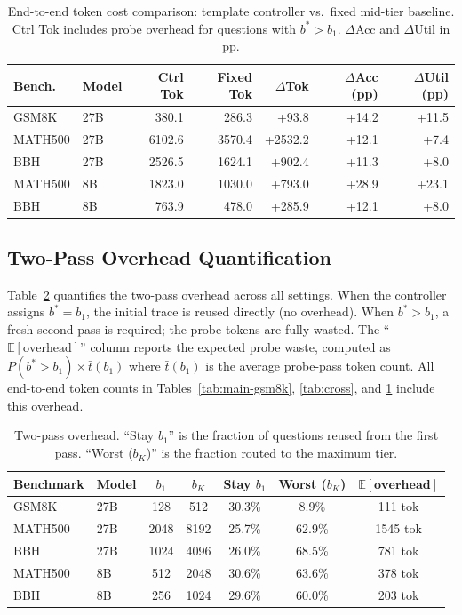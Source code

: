 \begin{table}[ht]
\centering
\caption{End-to-end token cost comparison: template controller vs.\ fixed mid-tier baseline. Ctrl Tok includes probe overhead for questions with $b^* > b_1$. $\Delta$Acc and $\Delta$Util in pp.}
\label{tab:token-deltas}
\small
\begin{tabular}{@{}llrrrrr@{}}
\toprule
\textbf{Bench.} & \textbf{Model} & \textbf{Ctrl Tok} & \textbf{Fixed Tok} & $\Delta$\textbf{Tok} & $\Delta$\textbf{Acc (pp)} & $\Delta$\textbf{Util (pp)} \\
\midrule
GSM8K & 27B & 380.1 & 286.3 & +93.8 & +14.2 & +11.5 \\
MATH500 & 27B & 6102.6 & 3570.4 & +2532.2 & +12.1 & +7.4 \\
BBH & 27B & 2526.5 & 1624.1 & +902.4 & +11.3 & +8.0 \\
MATH500 & 8B & 1823.0 & 1030.0 & +793.0 & +28.9 & +23.1 \\
BBH & 8B & 763.9 & 478.0 & +285.9 & +12.1 & +8.0 \\
\bottomrule
\end{tabular}
\end{table}

\subsection{Two-Pass Overhead Quantification}
\label{app:two-pass}

Table~\ref{tab:two-pass} quantifies the two-pass overhead across all settings.
When the controller assigns $b^* = b_1$, the initial trace is reused directly (no overhead).
When $b^* > b_1$, a fresh second pass is required; the probe tokens are fully wasted.
The ``$\mathbb{E}[\text{overhead}]$'' column reports the expected probe waste, computed as $P(b^* > b_1) \times \bar{t}(b_1)$ where $\bar{t}(b_1)$ is the average probe-pass token count.
All end-to-end token counts in Tables~\ref{tab:main-gsm8k}, \ref{tab:cross}, and \ref{tab:token-deltas} include this overhead.

\begin{table}[ht]
\centering
\caption{Two-pass overhead. ``Stay $b_1$'' is the fraction of questions reused from the first pass. ``Worst ($b_K$)'' is the fraction routed to the maximum tier.}
\label{tab:two-pass}
\small
\begin{tabular}{@{}llccccc@{}}
\toprule
\textbf{Benchmark} & \textbf{Model} & $b_1$ & $b_K$ & \textbf{Stay $b_1$} & \textbf{Worst ($b_K$)} & $\mathbb{E}[\textbf{overhead}]$ \\
\midrule
GSM8K & 27B & 128 & 512 & 30.3\% & 8.9\% & 111 tok \\
MATH500 & 27B & 2048 & 8192 & 25.7\% & 62.9\% & 1545 tok \\
BBH & 27B & 1024 & 4096 & 26.0\% & 68.5\% & 781 tok \\
MATH500 & 8B & 512 & 2048 & 30.6\% & 63.6\% & 378 tok \\
BBH & 8B & 256 & 1024 & 29.6\% & 60.0\% & 203 tok \\
\bottomrule
\end{tabular}
\end{table}

